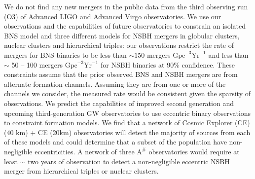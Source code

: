 We do not find any new mergers in the public data from the third observing run (O3) of Advanced LIGO and Advanced Virgo observatories. We use our observations and the capabilities of future observatories to constrain an isolated BNS model and three different models for NSBH mergers in globular clusters, nuclear clusters and hierarchical triples: our observations restrict the rate of mergers for BNS binaries to be less than $\sim 150$ mergers $\text{Gpc}^{-3}\text{Yr}^{-1}$ and less than $\sim $ 50 -- 100 mergers $\text{Gpc}^{-3}\text{Yr}^{-1}$ for NSBH binaries at 90\% confidence. These constraints assume that the prior observed BNS and NSBH mergers are from alternate formation channels. Assuming they are from one or more of the channels we consider, the measured rate would be consistent given the sparsity of observations. We predict the capabilities of improved second generation and upcoming third-generation GW observatories to use eccentric binary observations to constraint formation models. We find that a network of Cosmic Explorer (CE) (40 km) + CE (20km) observatories will detect the majority of sources from each of these models and could determine that a subset of the population have non-negligible eccentricities. A network of three $\text{A}^{\#}$ observatories would require at least $\sim$ two years of observation to detect a non-negligible eccentric NSBH merger from hierarchical triples or nuclear clusters.    

